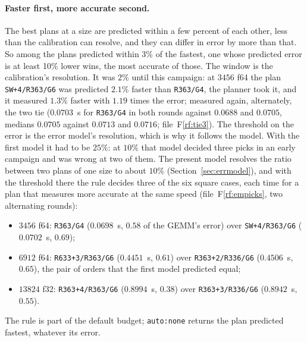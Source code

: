\documentclass[11pt]{article}
\newcommand{\rf}[1]{F\ref{rf:#1}}
\newcommand{\lv}[1]{\texttt{#1}}
\begin{document}
\paragraph{Faster first, more accurate second.}
The best plans at a size are predicted within a few percent of each other,
less than the calibration can resolve, and they can differ in error by more
than that.  So among the plans predicted within 3\% of the fastest, one whose
predicted error is at least 10\% lower wins, the most accurate of those.  The window is the calibration's
resolution.  It was $2\%$ until this campaign: at $3456$ f64 the plan
\lv{SW+4/R363/G6} was predicted $2.1\%$ faster than \lv{R363/G4}, the planner
took it, and it measured $1.3\%$ faster with $1.19$ times the error; measured
again, alternately, the two tie ($0.0703$~s for \lv{R363/G4} in both rounds
against $0.0688$ and $0.0705$, medians $0.0705$ against $0.0713$ and $0.0716$;
file~\rf{tie3}).  The threshold on the error is the error
model's resolution, which is why it follows the model.  With the first model
it had to be $25\%$: at $10\%$ that model decided three picks in an early
campaign and was wrong at two of them.  The present model resolves the
ratio between two plans of one size to about $10\%$
(Section~\ref{sec:errmodel}), and with the threshold there the rule decides
three of the six square cases, each time for a plan that measures more
accurate at the same speed (file~\rf{empicks}, two alternating rounds):
\begin{itemize}
\item $3456$ f64: \lv{R363/G4} ($0.0698$~s, $0.58$ of the GEMM's error) over
  \lv{SW+4/R363/G6} ($0.0702$~s, $0.69$);
\item $6912$ f64: \lv{R633+3/R363/G6} ($0.4451$~s, $0.61$) over
  \lv{R363+2/R336/G6} ($0.4506$~s, $0.65$), the pair of orders that the first
  model predicted equal;
\item $13824$ f32: \lv{R363+4/R363/G6} ($0.8994$~s, $0.38$) over
  \lv{R363+3/R336/G6} ($0.8942$~s, $0.55$).
\end{itemize}
The rule is part of the default budget; \lv{auto:none} returns the
plan predicted fastest, whatever its error.
\end{document}
